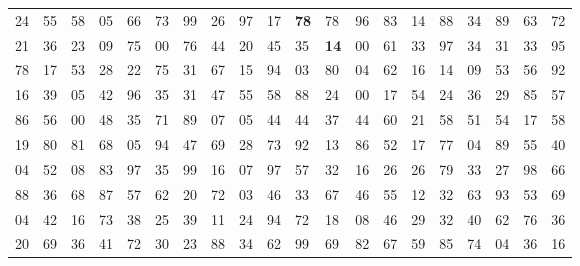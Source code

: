 \begin{table}[H]
\begin{tabular}{llllllllllllllllllll}
24 & 55 & 58 & 05 & 66 & 73 & 99 & 26                      & 97                               & \multicolumn{1}{l|}{17}          & \multicolumn{1}{l|}{\textbf{78}} & 78                               & 96 & 83 & 14 & 88 & 34 & 89 & 63 & 72 \\ \cline{11-12}
21 & 36 & 23 & 09 & 75 & 00 & 76 & 44                      & 20                               & 45                               & \multicolumn{1}{l|}{35}          & \multicolumn{1}{l|}{\textbf{14}} & 00 & 61 & 33 & 97 & 34 & 31 & 33 & 95 \\ \cline{12-12}
78 & 17 & 53 & 28 & 22 & 75 & 31 & 67                      & 15                               & 94                               & 03                               & 80                               & 04 & 62 & 16 & 14 & 09 & 53 & 56 & 92 \\
16 & 39 & 05 & 42 & 96 & 35 & 31 & 47                      & 55                               & 58                               & 88                               & 24                               & 00 & 17 & 54 & 24 & 36 & 29 & 85 & 57 \\
86 & 56 & 00 & 48 & 35 & 71 & 89 & 07                      & 05                               & 44                               & 44                               & 37                               & 44 & 60 & 21 & 58 & 51 & 54 & 17 & 58 \\
19 & 80 & 81 & 68 & 05 & 94 & 47 & 69                      & 28                               & 73                               & 92                               & 13                               & 86 & 52 & 17 & 77 & 04 & 89 & 55 & 40 \\
04 & 52 & 08 & 83 & 97 & 35 & 99 & 16                      & 07                               & 97                               & 57                               & 32                               & 16 & 26 & 26 & 79 & 33 & 27 & 98 & 66 \\
88 & 36 & 68 & 87 & 57 & 62 & 20 & 72                      & 03                               & 46                               & 33                               & 67                               & 46 & 55 & 12 & 32 & 63 & 93 & 53 & 69 \\
04 & 42 & 16 & 73 & 38 & 25 & 39 & 11                      & 24                               & 94                               & 72                               & 18                               & 08 & 46 & 29 & 32 & 40 & 62 & 76 & 36 \\
20 & 69 & 36 & 41 & 72 & 30 & 23 & 88                      & 34                               & 62                               & 99                               & 69                               & 82 & 67 & 59 & 85 & 74 & 04 & 36 & 16 \\

\end{tabular}
\end{table}
